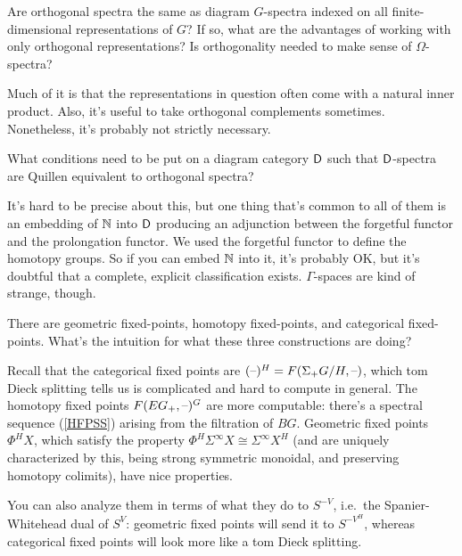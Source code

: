 \begin{ques}
Are orthogonal spectra the same as diagram $G$-spectra indexed on all finite-dimensional representations of $G$? If
so, what are the advantages of working with only orthogonal representations? Is orthogonality needed to make sense
of $\Omega$-spectra?
\end{ques}
Much of it is that the representations in question often come with a natural inner product. Also, it's useful to
take orthogonal complements sometimes. Nonetheless, it's probably not strictly necessary.
\begin{ques}
What conditions need to be put on a diagram category $\mathsf D$ such that $\mathsf D$-spectra are Quillen equivalent to
orthogonal spectra?
\end{ques}
It's hard to be precise about this, but one thing that's common to all of them is an embedding of $\mathbb N$ into $\mathsf D$
producing an adjunction between the forgetful functor and the prolongation functor. We used the forgetful functor
to define the homotopy groups. So if you can embed $\mathbb N$ into it, it's probably OK, but it's doubtful that a
complete, explicit classification exists. $\Gamma$-spaces are kind of strange,
though.
\begin{ques}
There are geometric fixed-points, homotopy fixed-points, and categorical fixed-points. What's the intuition for
what these three constructions are doing?
\end{ques}
Recall that the categorical fixed points are $(\text{--})^H = F(\Sigma_+ G/H,\text{--})$, which tom Dieck splitting tells us is
complicated and hard to compute in general. The homotopy fixed points $F(EG_+,\text{--})^G$ are more computable: there's
a spectral sequence (\cref{HFPSS}) arising from the filtration of $BG$. Geometric fixed points $\Phi^HX$, which
satisfy the property $\Phi^H\Sigma^\infty X \cong \Sigma^\infty X^H$ (and are uniquely characterized by this, being
strong symmetric monoidal, and preserving homotopy colimits), have nice properties.

You can also analyze them in terms of what they do to $S^{-V}$, i.e.\ the Spanier-Whitehead dual of $S^V$:
geometric fixed points will send it to $S^{-V^H}$, whereas categorical fixed points will look more like a tom Dieck
splitting.


